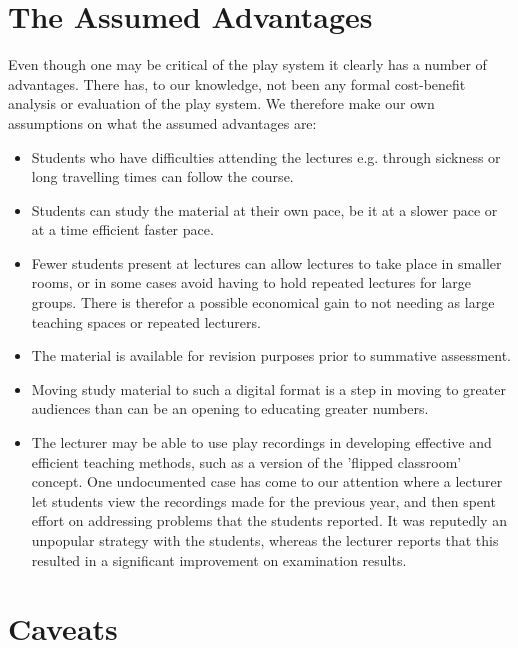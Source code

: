 \documentclass[a4paper,10pt]{article}
\begin{document}
\section{The Assumed Advantages}
 Even though one may be critical of the play system it clearly has a number of advantages. There has, to our knowledge, not been any formal cost-benefit analysis or evaluation of the play system. We therefore make our own assumptions on what the assumed advantages are:

 \begin{itemize}
   \item Students who have difficulties attending the lectures e.g. through sickness or long travelling times can follow the course.

   \item Students can study the material at their own pace, be it at a slower pace or at a time efficient faster pace.

   \item Fewer students present at lectures can allow lectures to take place in smaller rooms, or in some cases avoid having to hold repeated lectures for large groups. There is therefor a possible economical gain to not needing as large teaching spaces or repeated lecturers.

   \item The material is available for revision purposes prior to summative assessment.

   \item Moving study material to such a digital format is a step in moving to greater audiences than can be an opening to educating greater numbers.
     
   \item The lecturer may be able to use play recordings in developing effective and efficient teaching methods, such as a version of the 'flipped classroom' concept. One undocumented case has come to our attention where a lecturer let students view the recordings made for the previous year, and then spent effort on addressing problems that the students reported. It was reputedly an unpopular strategy with the students, whereas the lecturer reports that this resulted in a significant improvement on examination results.

     
 \end{itemize}
 


 \section{Caveats}
\end{document}
